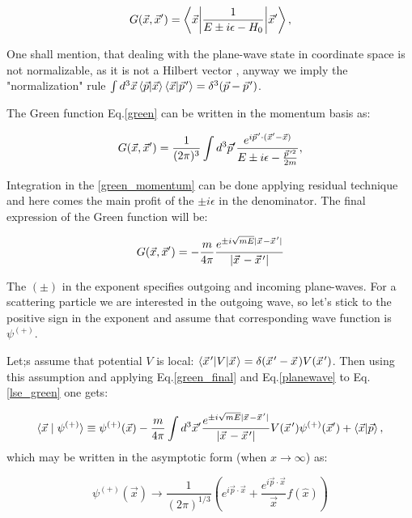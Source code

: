     \begin{equation}
        G(\vec{x}, \vec{x}^\prime) = \mel**{\vec{x}}{\frac{1}{E \pm i\epsilon - H_0}}{\vec{x}^\prime},
        \label{green}
    \end{equation}

    One shall mention, that dealing with the plane-wave state in coordinate space 
    is not normalizable, as it is not a Hilbert vector \cite{Sakurai}, anyway we
    imply the "normalization" rule
    $\int d^3\vec{x} \braket{\vec{p}}{\vec{x}} \braket{\vec{x}}{\pvec{p}^\prime} = \delta^3(\vec{p} - \pvec{p}^\prime)$.


    The Green function Eq.\ref{green} can be written in the momentum basis as:

    \begin{equation}
        G(\vec{x}, \vec{x}^\prime) = \frac{1}{(2\pi)^3} \int d^3 \vec{p}^\prime
        \frac{e^{i\pvec{p}'\cdot(\vec{x}'-\vec{x})}}{E \pm i\epsilon - \frac{\pvec{p}^{\prime 2}}{2m}},
        \label{green_momentum}
    \end{equation}


    Integration in the \ref*{green_momentum} can be done applying residual technique and here comes
    the main profit of the $\pm i\epsilon$ in the denominator.
    The final expression of the Green function will be:

    \begin{equation}
        G(\vec{x}, \vec{x}^\prime) = - \frac{m}{4\pi} \frac{e^{\pm i\sqrt{mE}|\pvec{x} -\pvec{x}^\prime |}}{|\pvec{x} -\pvec{x}^\prime |}
        \label{green_final}
    \end{equation}

    The $(\pm)$ in the exponent specifies outgoing and incoming plane-waves. For a scattering
    particle we are interested in the outgoing wave, so let's stick to the positive sign in the exponent
    and assume that corresponding wave function is $\psi^{(+)}$. 

    Let;s assume that potential $V$ is local: $\mel**{\pvec{x}^\prime}{V}{\pvec{x}} = \delta(\pvec{x}^\prime - \pvec{x})V(\pvec{x}^\prime)$. 
    Then using this assumption and applying Eq.\ref{green_final} and 
    Eq.\ref{planewave} to Eq.\ref*{lse_green} one gets:

    \begin{equation}
        \langle \vec{x}  \mid \psi^{(+)} \rangle \equiv \psi^{(+)}(\vec{x}) 
        - \frac{m}{4\pi} \int d^3 \vec{x}^\prime \frac{e^{\pm i\sqrt{mE}|\pvec{x} -\pvec{x}^\prime |}}{|\pvec{x} -\pvec{x}^\prime |} 
        V(\pvec{x}^\prime) \psi^{(+)}(\vec{x}^\prime) + \braket{\vec{x}}{\vec{p}},
        \label{lse_green_explicit}
    \end{equation}
    which may be written in the asymptotic form (when $x \rightarrow \infty$) as:

    \begin{equation}
        \psi^{(+)}(\vec{x}) \rightarrow \frac{1}{(2\pi)^{1/3}}
        \left( e^{i\vec{p} \cdot \vec{x}} + \frac{e^{i\vec{p} \cdot \vec{x}}}{\vec{x}} f(\hat{x}) \right)
        \label{lse_green_explicit}
    \end{equation}